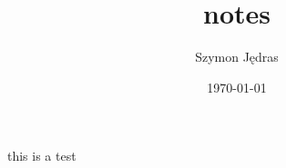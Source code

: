 \documentclass[a4paper]{article}
\title{notes}
\author{Szymon Jędras}
\date{\today}
\begin{document}
this is a test

  
\end{document}
